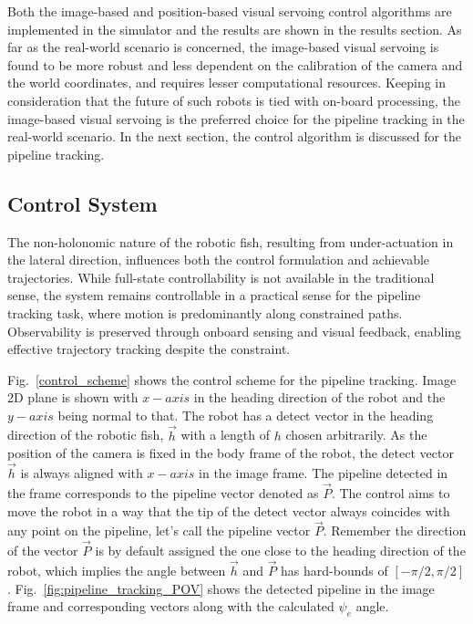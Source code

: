 \documentclass[pdflatex,sn-mathphys-num]{sn-jnl}
\theoremstyle{thmstyleone}%
\begin{document}
\par Both the image-based and position-based visual servoing control algorithms are implemented in the simulator and the results are shown in the results section. As far as the real-world scenario is concerned, the image-based visual servoing is found to be more robust and less dependent on the calibration of the camera and the world coordinates, and requires lesser computational resources. Keeping in consideration that the future of such robots is tied with on-board processing, the image-based visual servoing is the preferred choice for the pipeline tracking in the real-world scenario. In the next section, the control algorithm is discussed for the pipeline tracking.
\subsection{Control System}
\par The non-holonomic nature of the robotic fish, resulting from under-actuation in the lateral direction, influences both the control formulation and achievable trajectories. While full-state controllability is not available in the traditional sense, the system remains controllable in a practical sense for the pipeline tracking task, where motion is predominantly along constrained paths. Observability is preserved through onboard sensing and visual feedback, enabling effective trajectory tracking despite the constraint.
\par Fig.~\ref{control_scheme} shows the control scheme for the pipeline tracking. Image 2D plane is shown with $x-axis$ in the heading direction of the robot and the $y-axis$ being normal to that. The robot has a detect vector in the heading direction of the robotic fish, $\vec{h}$ with a length of $h$ chosen arbitrarily. As the position of the camera is fixed in the body frame of the robot, the detect vector $\vec{h}$ is always aligned with $x-axis$ in the image frame. The pipeline detected in the frame corresponds to the pipeline vector denoted as $\vec{P}$. The control aims to move the robot in a way that the tip of the detect vector always coincides with any point on the pipeline, let's call the pipeline vector $\vec{P}$. Remember the direction of the vector $\vec{P}$ is by default assigned the one close to the heading direction of the robot, which implies the angle between $\vec{h}$ and $\vec{P}$ has hard-bounds of $[-\pi/2,\pi/2]$. Fig.~\ref{fig:pipeline_tracking_POV} shows the detected pipeline in the image frame and corresponding vectors along with the calculated $\psi_e$ angle.
\end{document}
